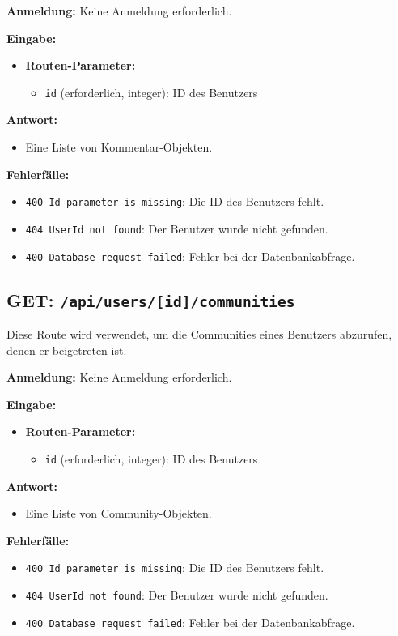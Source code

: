 \documentclass[a4paper,12pt]{article}
\begin{document}
\textbf{Anmeldung:} Keine Anmeldung erforderlich.

\textbf{Eingabe:}
\begin{itemize}
    \item \textbf{Routen-Parameter:}
    \begin{itemize}
        \item \texttt{id} (erforderlich, integer): ID des Benutzers
    \end{itemize}
\end{itemize}

\textbf{Antwort:}
\begin{itemize}
    \item Eine Liste von Kommentar-Objekten.
\end{itemize}

\textbf{Fehlerfälle:}
\begin{itemize}
    \item \texttt{400 Id parameter is missing}: Die ID des Benutzers fehlt.
    \item \texttt{404 UserId not found}: Der Benutzer wurde nicht gefunden.
    \item \texttt{400 Database request failed}: Fehler bei der Datenbankabfrage.
\end{itemize}

\subsection{GET: \texttt{/api/users/[id]/communities}}

Diese Route wird verwendet, um die Communities eines Benutzers abzurufen, denen er beigetreten ist.

\textbf{Anmeldung:} Keine Anmeldung erforderlich.

\textbf{Eingabe:}
\begin{itemize}
    \item \textbf{Routen-Parameter:}
    \begin{itemize}
        \item \texttt{id} (erforderlich, integer): ID des Benutzers
    \end{itemize}
\end{itemize}

\textbf{Antwort:}
\begin{itemize}
    \item Eine Liste von Community-Objekten.
\end{itemize}

\textbf{Fehlerfälle:}
\begin{itemize}
    \item \texttt{400 Id parameter is missing}: Die ID des Benutzers fehlt.
    \item \texttt{404 UserId not found}: Der Benutzer wurde nicht gefunden.
    \item \texttt{400 Database request failed}: Fehler bei der Datenbankabfrage.
\end{itemize}
\end{document}
